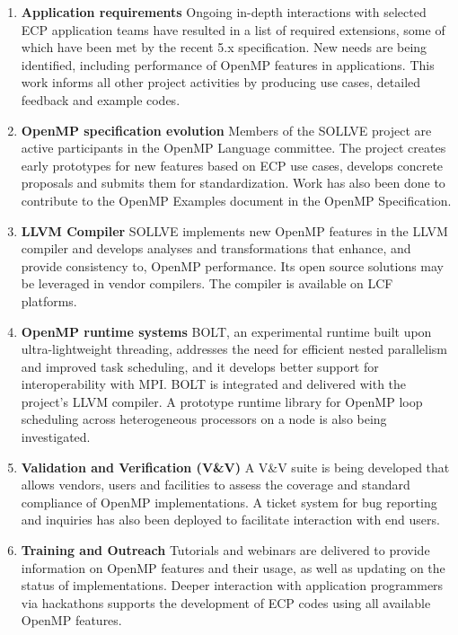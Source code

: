 \begin{enumerate}

\item {\bf Application requirements}
Ongoing in-depth interactions with selected ECP application teams have resulted in a list of required extensions, some of which have been met by the recent 5.x specification.  New needs are being identified, including performance of OpenMP features in applications. This work informs all other project activities by producing use cases, detailed feedback and example codes. 

\item {\bf OpenMP specification evolution}
Members of the SOLLVE project are active participants in the OpenMP Language committee. The project creates early prototypes for new features based on ECP use cases, develops concrete proposals and submits them for standardization. Work has also been done to contribute to the OpenMP Examples document in the OpenMP Specification. 

\item {\bf LLVM  Compiler}
SOLLVE implements new OpenMP features in the LLVM compiler and develops analyses and transformations that enhance, and provide consistency to, OpenMP performance. Its open source solutions may be leveraged in vendor compilers. The compiler is available on LCF platforms.


\item {\bf OpenMP runtime systems} 
BOLT, an experimental runtime built upon ultra-lightweight threading, addresses the need for efficient nested parallelism and improved task scheduling, and it develops better support for interoperability with MPI. BOLT is integrated and delivered with the project's LLVM compiler. A prototype runtime library for OpenMP loop scheduling across heterogeneous processors on a node is also being investigated. 

\item {\bf Validation and Verification (V\&V)}
A V\&V suite is being developed that allows vendors, users and facilities to assess the coverage and standard compliance of OpenMP implementations. A ticket system for bug reporting and inquiries has also been deployed to facilitate interaction with end users.
\item{\bf Training and Outreach}
 Tutorials and webinars are delivered to provide information on OpenMP features and their usage, as well as updating on the status of 
 implementations. Deeper interaction with application programmers via hackathons supports the development of ECP codes using all available OpenMP features.
\end{enumerate}


